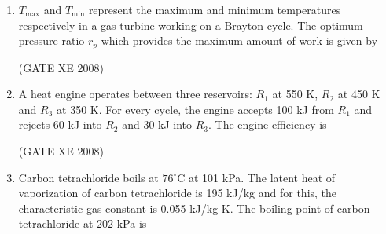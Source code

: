 \documentclass[12pt]{article}
\begin{document}
\begin{enumerate}
 (GATE XE 2008)  

\item $T_{\max}$ and $T_{\min}$ represent the maximum and minimum temperatures respectively in a gas turbine working on a Brayton cycle. The optimum pressure ratio $r_p$ which provides the maximum amount of work is given by  

\begin{enumerate}
\end{enumerate}


 (GATE XE 2008)  

\item A heat engine operates between three reservoirs: $R_1$ at 550 K, $R_2$ at 450 K and $R_3$ at 350 K. For every cycle, the engine accepts 100 kJ from $R_1$ and rejects 60 kJ into $R_2$ and 30 kJ into $R_3$. The engine efficiency is  

\begin{enumerate}
 \end{enumerate}

 (GATE XE 2008)  

\item Carbon tetrachloride boils at $76^{\circ}$C at 101 kPa. The latent heat of vaporization of carbon tetrachloride is 195 kJ/kg and for this, the characteristic gas constant is 0.055 kJ/kg K. The boiling point of carbon tetrachloride at 202 kPa is 

\begin{enumerate}
 \end{enumerate}


\end{enumerate}
\end{document}
